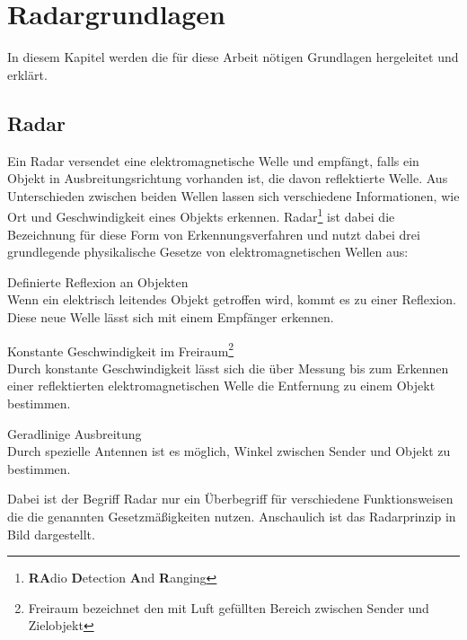 \chapter{Radargrundlagen}
In diesem Kapitel werden die für diese Arbeit nötigen Grundlagen hergeleitet und erklärt. 
\section{Radar}
Ein Radar versendet eine elektromagnetische Welle und empfängt, falls ein Objekt in Ausbreitungsrichtung vorhanden ist, die davon reflektierte Welle. Aus Unterschieden zwischen beiden Wellen lassen sich verschiedene Informationen, wie Ort und Geschwindigkeit eines Objekts erkennen. Radar\footnote{\textbf{RA}dio \textbf{D}etection \textbf{A}nd \textbf{R}anging} ist dabei die Bezeichnung für diese Form von Erkennungsverfahren und nutzt dabei drei grundlegende physikalische Gesetze von elektromagnetischen Wellen aus:
\begin{description}
\item Definierte Reflexion an Objekten \\
Wenn ein elektrisch leitendes Objekt getroffen wird, kommt es zu einer Reflexion. Diese neue Welle lässt sich mit einem Empfänger erkennen. 
\item Konstante Geschwindigkeit im Freiraum\footnote{Freiraum bezeichnet den mit Luft gefüllten Bereich zwischen Sender und Zielobjekt} \\
Durch konstante Geschwindigkeit lässt sich die über Messung bis zum Erkennen einer reflektierten elektromagnetischen Welle die Entfernung zu einem Objekt bestimmen. 
\item Geradlinige Ausbreitung \\
Durch spezielle Antennen ist es möglich, Winkel zwischen Sender und Objekt zu bestimmen.
\end{description}
Dabei ist der Begriff Radar nur ein Überbegriff für verschiedene Funktionsweisen die die genannten Gesetzmäßigkeiten nutzen. Anschaulich ist das Radarprinzip in Bild dargestellt.


